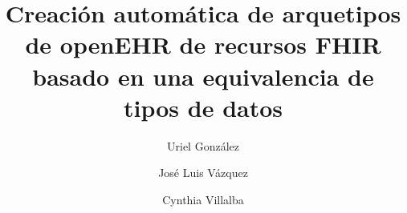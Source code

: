 \title{Creación automática de arquetipos de openEHR de recursos FHIR basado en una equivalencia de tipos de datos}

\author{Uriel González}

\author{José Luis Vázquez}

\author{Cynthia Villalba}
